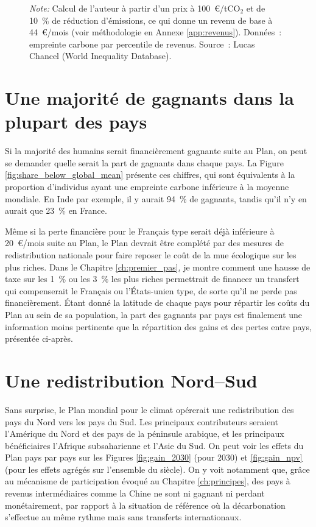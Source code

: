 \documentclass[a5paper,french,openany]{memoir}
\begin{document}
\begin{figure}[h!]
\begin{subfigure}{.5\textwidth}
\end{subfigure}
{\footnotesize \textit{Note:} Calcul de l'auteur à partir d'un prix à 100~\euro{}/tCO$_\text{2}$ et de 10~\% de réduction d'émissions, ce qui donne un revenu de base à 44~\euro{}/mois (voir méthodologie en Annexe \ref{app:revenus}). Données~: empreinte carbone par percentile de revenus. Source~: Lucas Chancel (World Inequality Database).}
\end{figure}

\section{Une majorité de gagnants dans la plupart des pays}

Si la majorité des humains serait financièrement gagnante suite au Plan, on peut se demander quelle serait la part de gagnants dans chaque pays. La Figure \ref{fig:share_below_global_mean} présente ces chiffres, qui sont équivalents à la proportion d'individus ayant une empreinte carbone inférieure à la moyenne mondiale. En Inde par exemple, il y aurait 94~\% de gagnants, tandis qu'il n'y en aurait que 23~\% en France.  

Même si la perte financière pour le Français type serait déjà inférieure à 20~\euro{}/mois suite au Plan, le Plan devrait être complété par des mesures de redistribution nationale pour faire reposer le coût de la mue écologique sur les plus riches. Dans le Chapitre \ref{ch:premier_pas}, je montre comment une hausse de taxe sur les 1~\% ou les 3~\% les plus riches permettrait de financer un transfert qui compenserait le Français ou l'États-unien type, de sorte qu'il ne perde pas financièrement. Étant donné la latitude de chaque pays pour répartir les coûts du Plan au sein de sa population, la part des gagnants par pays est finalement une information moins pertinente que la répartition des gains et des pertes entre pays, présentée ci-après.


\section{Une redistribution Nord--Sud}

Sans surprise, le Plan mondial pour le climat opérerait une redistribution des pays du Nord vers les pays du Sud. Les principaux contributeurs seraient l'Amérique du Nord et des pays de la péninsule arabique, et les principaux bénéficiaires l'Afrique subsaharienne et l'Asie du Sud. On peut voir les effets du Plan pays par pays sur les Figures \ref{fig:gain_2030} (pour 2030) et \ref{fig:gain_npv} (pour les effets agrégés sur l'ensemble du siècle). On y voit notamment que, grâce au mécanisme de participation évoqué au Chapitre \ref{ch:principes}, des pays à revenus intermédiaires comme la Chine ne sont ni gagnant ni perdant monétairement, par rapport à la situation de référence où la décarbonation s'effectue au même rythme mais sans transferts internationaux. 
\end{document}
